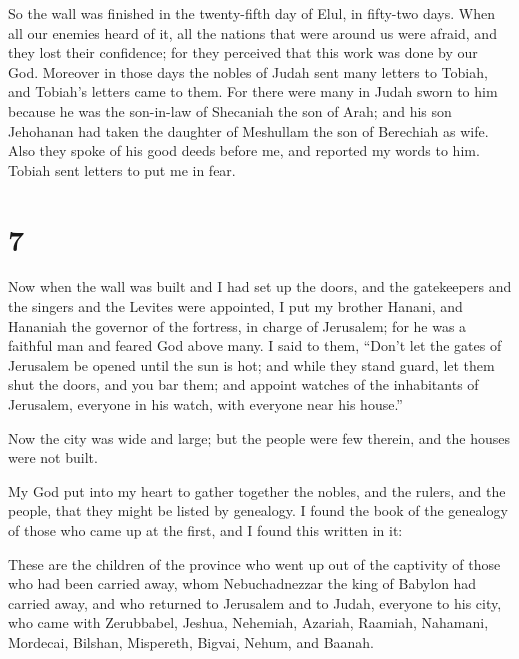  So the wall was finished in the twenty-fifth day of
Elul, in fifty-two days.  When all our enemies heard of
it, all the nations that were around us were afraid, and they lost their
confidence; for they perceived that this work was done by our God.
 Moreover in those days the nobles of Judah sent many
letters to Tobiah, and Tobiah's letters came to them. 
For there were many in Judah sworn to him because he was the son-in-law
of Shecaniah the son of Arah; and his son Jehohanan had taken the
daughter of Meshullam the son of Berechiah as wife.  Also
they spoke of his good deeds before me, and reported my words to him.
Tobiah sent letters to put me in fear.

\hypertarget{section-6}{%
\section{7}\label{section-6}}

 Now when the wall was built and I had set up the doors,
and the gatekeepers and the singers and the Levites were appointed,
 I put my brother Hanani, and Hananiah the governor of the
fortress, in charge of Jerusalem; for he was a faithful man and feared
God above many.  I said to them, ``Don't let the gates of
Jerusalem be opened until the sun is hot; and while they stand guard,
let them shut the doors, and you bar them; and appoint watches of the
inhabitants of Jerusalem, everyone in his watch, with everyone near his
house.''

 Now the city was wide and large; but the people were few
therein, and the houses were not built.

 My God put into my heart to gather together the nobles,
and the rulers, and the people, that they might be listed by genealogy.
I found the book of the genealogy of those who came up at the first, and
I found this written in it:

 These are the children of the province who went up out of
the captivity of those who had been carried away, whom Nebuchadnezzar
the king of Babylon had carried away, and who returned to Jerusalem and
to Judah, everyone to his city,  who came with Zerubbabel,
Jeshua, Nehemiah, Azariah, Raamiah, Nahamani, Mordecai, Bilshan,
Mispereth, Bigvai, Nehum, and Baanah.

